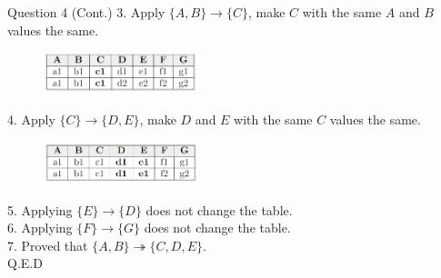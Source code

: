 \begin{frame}[fragile]{Question 4 (Cont.)}
	3. Apply $\{A,B\} \rightarrow \{C\}$, make $C$ with the same $A$ and $B$ values the same.\\
	\begin{figure}
		\includegraphics[width=0.4\textwidth, trim=0 0 0 0, clip]{4221-t5/images/4-3.png}
	\end{figure}
	
	4. Apply $\{C\} \rightarrow \{D,E\}$, make $D$ and $E$ with the same $C$ values the same.\\
	\begin{figure}
		\includegraphics[width=0.4\textwidth, trim=0 0 0 0, clip]{4221-t5/images/4-4.png}
	\end{figure}

	5. Applying $\{E\} \rightarrow \{D\}$ does not change the table.\\\vspace{5pt}
	6. Applying $\{F\} \rightarrow \{G\}$ does not change the table.\\\vspace{5pt}
	7. Proved that $\{A,B\} \twoheadrightarrow \{C,D,E\}.$\\
	\hfill Q.E.D
	
\end{frame}



